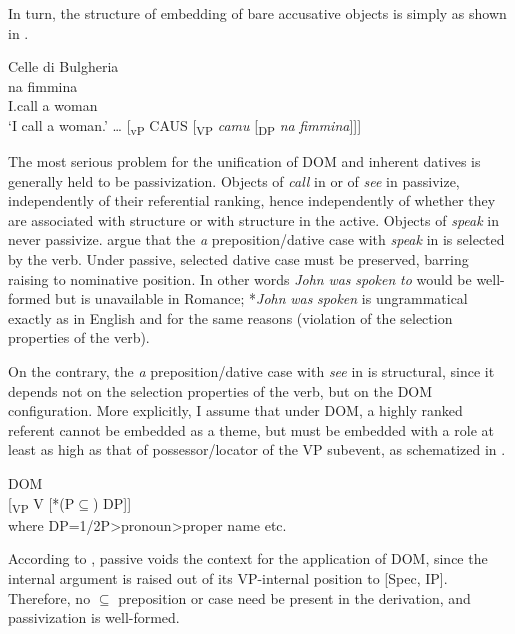 \documentclass[output=paper,colorlinks,citecolor=brown,nonflat]{./langscibook}
\begin{document}
In turn, the structure of embedding of bare accusative objects is simply as shown in . 

\ea%
    \label{ex:manzini:7}
    Celle di Bulgheria\\
    \ea\label{ex:manzini:7a}
     {na} {fimmina}\\
        I.call a woman\\
    \glt ‘I call a woman.’             
    \ex\label{ex:manzini:7b}   
    … [\textsubscript{vP} CAUS  [\textsubscript{VP} \textit{camu} [\textsubscript{DP} \textit{na} \textit{fimmina}]]]
    \z
\z

The most serious problem for the unification of DOM and inherent datives is generally held to be passivization. Objects of \textit{call} in  or of \textit{see} in  passivize, independently of their referential ranking, hence independently of whether they are associated with structure  or with structure  in the active. Objects of \textit{speak} in  never passivize. \citet{ManziniFranco2016} argue that the \textit{a} preposition/dative case with \textit{speak} in  is selected by the verb. Under passive, selected dative case must be preserved, barring raising to nominative position. In other words \textit{John} \textit{was} \textit{spoken} \textit{to} would be well-formed but is unavailable in Romance; *\textit{John} \textit{was} \textit{spoken} is ungrammatical exactly as in English and for the same reasons (violation of the selection properties of the verb).

On the contrary, the \textit{a} preposition/dative case with \textit{see} in  is structural, since it depends not on the selection properties of the verb, but on the DOM configuration. More explicitly, I assume that under DOM, a highly ranked referent cannot be embedded as a theme, but must be embedded with a role at least as high as that of possessor/locator of the VP subevent, as schematized in .

\ea%
    \label{ex:manzini:8}
    DOM\\{}
    [\textsubscript{VP} V   [*(P${\subseteq}$) DP]]\\
    where DP=1/2P>pronoun>proper name etc.
\z

According to \citeauthor{ManziniFranco2016}, passive voids the context for the application of DOM, since the internal argument is raised out of its VP-internal position to [Spec, IP]. Therefore, no ${\subseteq}$ preposition or case need be present in the derivation, and passivization is well-formed.  
\end{document}
